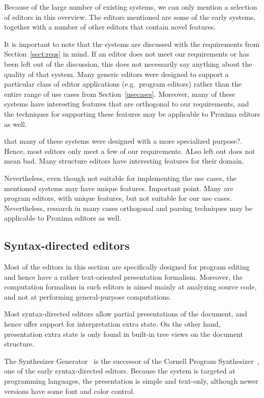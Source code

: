 \documentclass{speauth}
\begin{document}
Because of the large number of existing systems, we can only mention a selection of editors in this overview. The editors mentioned are some of the early systems, together with a number of other editors that contain novel features.

It is important to note that the systems are discussed with the requirements from Section~\ref{sect:reqs} in mind. If an editor does not meet our requirements or has been left out of the discussion, this does not necessarily say anything about the quality of that system. Many generic editors were designed to support  a particular class of editor applications (e.g.\ program editors) rather than the entire range of use cases from Section~\ref{usecases}. Moreover, many of these systems have interesting features that are orthogonal to our requirements, and the techniques for supporting these features may be applicable to Proxima editors as well.

\bc
that many of these systems were designed with a more specialized purpose?. Hence, most editors only meet a few of our requirements. ALso left out does not mean bad. Many structure editors have interesting features for their domain. 

Nevertheless, even though not suitable for implementing the use cases, the mentioned systems may have unique features.  
Important point.
Many are program editors, with unique features, but not suitable for our use cases. Nevertheless, research in many cases orthogonal and parsing techniques may be applicable to Proxima editors as well.
\fromHere
\ec
																
\subsection{Syntax-directed editors} \label{sect:synDirEditors}

Most of the editors in this section are specifically designed for program editing and hence have a rather text-oriented presentation formalism. Moreover, the computation formalism in such editors is aimed mainly at analyzing source code, and not at performing general-purpose computations. 

Most syntax-directed editors allow partial presentations of the document, and hence offer support for interpretation extra state. On the other hand, presentation extra state is only found in built-in tree views on the document structure.


The Synthesizer Generator~\cite{reps84synGen} is the successor of the Cornell Program Synthesizer~\cite{teitelbaum81progSynth}, one of the early syntax-directed editors. Because the system is targeted at programming languages, the presentation is simple and text-only, although newer versions have some font and color control. 
\end{document}
